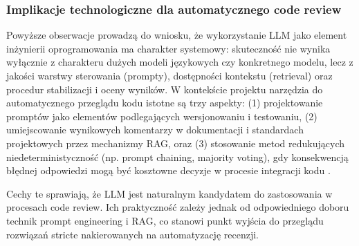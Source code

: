 \subsubsection{Implikacje technologiczne dla automatycznego code review}
Powyższe obserwacje prowadzą do wniosku, że wykorzystanie LLM jako element inżynierii oprogramowania ma charakter
systemowy: skuteczność nie wynika wyłącznie z charakteru dużych modeli językowych czy konkretnego modelu, lecz
z jakości warstwy sterowania (prompty), dostępności kontekstu (retrieval) oraz procedur stabilizacji i oceny wyników.
W kontekście projektu narzędzia do automatycznego przeglądu kodu istotne są trzy aspekty: (1) projektowanie promptów
jako elementów podlegających wersjonowaniu i testowaniu, (2) umiejscowanie wynikowych komentarzy w dokumentacji i 
standardach projektowych przez mechanizmy RAG, oraz (3) stosowanie metod redukujących niedeterministyczność (np. 
prompt chaining, majority voting), gdy konsekwencją błędnej odpowiedzi mogą być kosztowne decyzje 
w procesie integracji kodu \cite{alsofyani2025datarace,syahputri2025prompt}.

Cechy te sprawiają, że LLM jest naturalnym kandydatem do zastosowania w procesach code review. Ich praktyczność zależy jednak
od odpowiedniego doboru technik prompt engineering i RAG, co stanowi punkt wyjścia do przeglądu rozwiązań stricte nakierowanych 
na automatyzację recenzji.